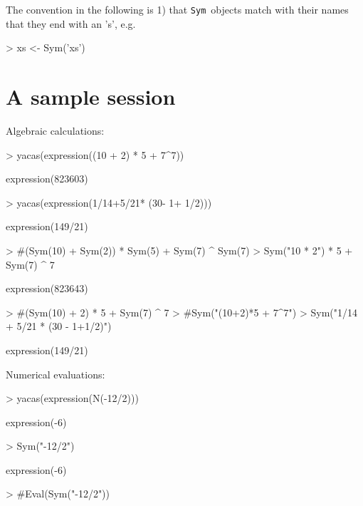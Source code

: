 \documentclass[]{article}
\def\sym{\texttt{Sym}}
\begin{document}
The convention in the following is 1) that \sym\ objects match with
their names that they end with an 's', e.g.
\begin{Schunk}
\begin{Sinput}
> xs <- Sym('xs')
\end{Sinput}
\end{Schunk}


\section{A sample session} 
\label{sec:samplesession}

Algebraic calculations:
\begin{Schunk}
\begin{Sinput}
> yacas(expression((10 + 2) * 5 + 7^7))
\end{Sinput}
\begin{Soutput}
expression(823603)
\end{Soutput}
\begin{Sinput}
> yacas(expression(1/14+5/21* (30- 1+ 1/2)))
\end{Sinput}
\begin{Soutput}
expression(149/21)
\end{Soutput}
\end{Schunk}

\begin{Schunk}
\begin{Sinput}
> #(Sym(10) + Sym(2)) * Sym(5) + Sym(7) ^ Sym(7)
> Sym("10 * 2") * 5 + Sym(7) ^ 7
\end{Sinput}
\begin{Soutput}
expression(823643)
\end{Soutput}
\begin{Sinput}
> #(Sym(10) + 2) * 5 + Sym(7) ^ 7
> #Sym("(10+2)*5 + 7^7")
> Sym("1/14 + 5/21 * (30 - 1+1/2)")
\end{Sinput}
\begin{Soutput}
expression(149/21)
\end{Soutput}
\end{Schunk}


Numerical evaluations:
\begin{Schunk}
\begin{Sinput}
> yacas(expression(N(-12/2)))
\end{Sinput}
\begin{Soutput}
expression(-6)
\end{Soutput}
\end{Schunk}
\begin{Schunk}
\begin{Sinput}
> Sym("-12/2")
\end{Sinput}
\begin{Soutput}
expression(-6)
\end{Soutput}
\begin{Sinput}
> #Eval(Sym("-12/2"))
\end{Sinput}
\end{Schunk}
\end{document}
